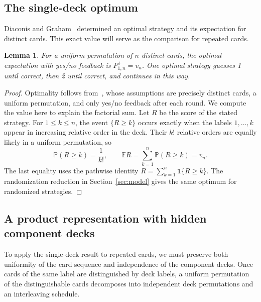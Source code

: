 \documentclass[11pt,reqno]{amsart}
\numberwithin{equation}{section}
\newtheorem{lemma}[theorem]{Lemma}
\theoremstyle{remark}
\theoremstyle{definition}
\newcommand{\E}{\mathbb E}
\newcommand{\Pp}{\mathbb P}
\newcommand{\ind}{\mathbf 1}
\begin{document}
\subsection{The single-deck optimum}\label{sec:single}
Diaconis and Graham~\cite[Theorem~5]{DG} determined an optimal strategy and its expectation for distinct cards. This exact value will serve as the comparison for repeated cards.
\begin{lemma}\label{up:lem:single}
For a uniform permutation of $n$ distinct cards, the optimal expectation with yes/no feedback is $P^+_{1,n}=v_n$. One optimal strategy guesses 1 until correct, then 2 until correct, and continues in this way.
\end{lemma}
\begin{proof}
Optimality follows from~\cite[Theorem~5]{DG}, whose assumptions are precisely distinct cards, a uniform permutation, and only yes/no feedback after each round. We compute the value here to explain the factorial sum. Let $R$ be the score of the stated strategy. For $1\le k\le n$, the event $\{R\ge k\}$ occurs exactly when the labels $1,\ldots,k$ appear in increasing relative order in the deck. Their $k!$ relative orders are equally likely in a uniform permutation, so
\[
 \Pp(R\ge k)=\frac1{k!},\qquad
 \E R=\sum_{k=1}^n\Pp(R\ge k)=v_n.
\]
The last equality uses the pathwise identity $R=\sum_{k=1}^n\ind\{R\ge k\}$. The randomization reduction in Section~\ref{sec:model} gives the same optimum for randomized strategies.
\end{proof}

\subsection{A product representation with hidden component decks}
To apply the single-deck result to repeated cards, we must preserve both uniformity of the card sequence and independence of the component decks. Once cards of the same label are distinguished by deck labels, a uniform permutation of the distinguishable cards decomposes into independent deck permutations and an interleaving schedule.
\end{document}
